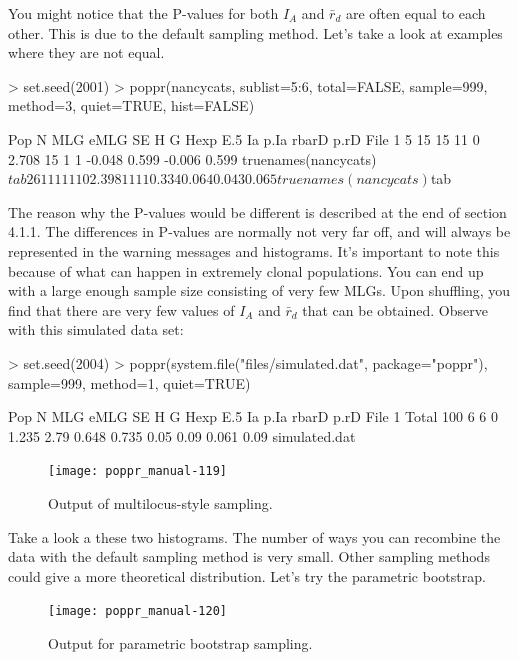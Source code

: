 \documentclass[letterpaper]{article}
\begin{document}
You might notice that the P-values for both $I_A$ and $\bar r_d$ are often equal to each other. This is due to the default sampling method.\cite{Agapow:2001} Let's take a look at examples where they are not equal.
\begin{Schunk}
\begin{Sinput}
> set.seed(2001)
> poppr(nancycats, sublist=5:6, total=FALSE, sample=999, method=3, quiet=TRUE, hist=FALSE)
\end{Sinput}
\begin{Soutput}
  Pop  N MLG eMLG SE     H  G Hexp E.5     Ia  p.Ia  rbarD  p.rD                     File
1   5 15  15   11  0 2.708 15    1   1 -0.048 0.599 -0.006 0.599 truenames(nancycats)$tab
2   6 11  11   11  0 2.398 11    1   1  0.334 0.064  0.043 0.065 truenames(nancycats)$tab
\end{Soutput}
\end{Schunk}
The reason why the P-values would be different is described at the end of section 4.1.1. The differences in P-values are normally not very far off, and will always be represented in the warning messages and histograms. It's important to note this because of what can happen in extremely clonal populations. You can end up with a large enough sample size consisting of very few MLGs. Upon shuffling, you find that there are very few values of $I_A$ and $\bar r_d$ that can be obtained. Observe with this simulated data set:
\begin{Schunk}
\begin{Sinput}
> set.seed(2004)
> poppr(system.file("files/simulated.dat", package="poppr"), sample=999, method=1, quiet=TRUE)
\end{Sinput}
\end{Schunk}
\begin{Schunk}
\begin{Soutput}
    Pop   N MLG eMLG SE     H    G  Hexp   E.5   Ia p.Ia rbarD p.rD          File
1 Total 100   6    6  0 1.235 2.79 0.648 0.735 0.05 0.09 0.061 0.09 simulated.dat
\end{Soutput}
\end{Schunk}
\begin{figure}[h!]
  \centering
  \caption{Output of multilocus-style sampling.}
  \label{simulated_dist_fig}
\texttt{[image: poppr\_manual-119]}
\end{figure}
\newpage

Take a look a these two histograms. The number of ways you can recombine the data with the default sampling method is very small. Other sampling methods could give a more theoretical distribution. Let's try the parametric bootstrap.
\begin{figure}[h!]
  \centering
  \caption{Output for parametric bootstrap sampling.}
  \label{simulated_param_fig}
\texttt{[image: poppr\_manual-120]}
\end{figure}
\end{document}
